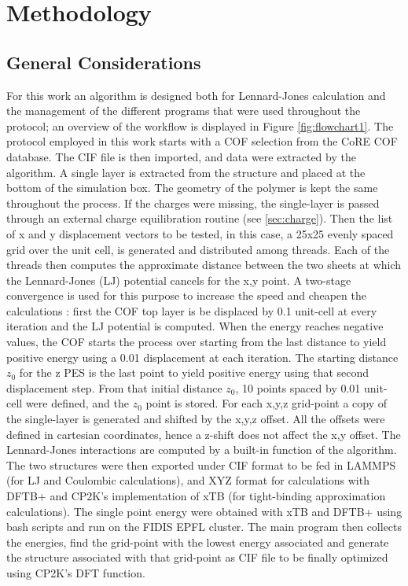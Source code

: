 \chapter{Methodology}
\section{General Considerations}

For this work an algorithm is designed both for Lennard-Jones calculation and the management of the different programs that were used throughout the protocol; an overview of the workflow is displayed in Figure \ref{fig:flowchart1}.
The protocol employed in this work starts with a COF selection from the CoRE COF database. The CIF file is then imported, and data were extracted by the algorithm. A single layer is extracted from the structure and placed at the bottom of the simulation box. The geometry of the polymer is kept the same throughout the process. If the charges were missing, the single-layer is passed through an external charge equilibration routine (see \ref{sec:charge}). Then the list of x and y displacement vectors to be tested, in this case, a 25x25 evenly spaced grid over the unit cell, is generated and distributed among threads. Each of the threads then computes the approximate distance between the two sheets at which the Lennard-Jones (LJ) potential cancels for the x,y point.  A two-stage convergence is used for this purpose to increase the speed and cheapen the calculations : first the COF top layer is be displaced by 0.1 unit-cell at every iteration and the LJ potential is computed. When the energy reaches negative values, the COF starts the process over starting from the last distance to yield positive energy using a 0.01 displacement at each iteration. The starting distance $z_0$ for the z PES is the last point to yield positive energy using that second displacement step. From that initial distance $z_0$, 10 points spaced by 0.01 unit-cell were defined, and the $z_0$ point is stored. For each x,y,z grid-point a copy of the single-layer is generated and shifted by the x,y,z offset. All the offsets were defined in cartesian coordinates, hence a z-shift does not affect the x,y offset. The Lennard-Jones interactions are computed by a built-in function of the algorithm. The two structures were then exported under CIF format to be fed in LAMMPS (for LJ and Coulombic calculations), and XYZ format for calculations with DFTB+ and CP2K's implementation of xTB (for tight-binding approximation calculations). The single point energy were obtained with xTB and DFTB+ using bash scripts and run on the FIDIS EPFL cluster. The main program then collects the energies, find the grid-point with the lowest energy associated and generate the structure associated with that grid-point as CIF file to be finally optimized using CP2K's DFT function.



